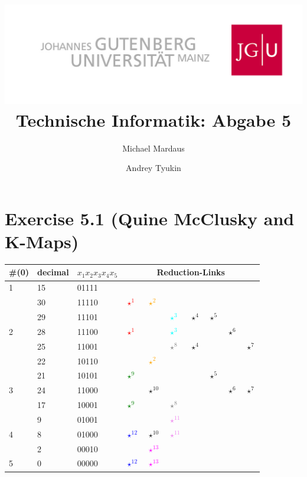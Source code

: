 \documentclass[10pt,a4paper]{scrartcl}
\author{Michael Mardaus \and Andrey Tyukin}
\title{\includegraphics[scale=0.2]{../logo_schriftzug}\\
Technische Informatik: Abgabe 5}
\newcommand{\subExercise}[1]{\vspace{0.5em} \noindent{\bf #1)}}
\begin{document}
\maketitle

\section*{Exercise 5.1 (Quine McClusky and K-Maps)}
\subExercise{a}
\begin{tabular}{|l||l|l|l|l|l|l|l|l|l|}\hline
\#(0) & decimal & $x_1x_2x_3x_4x_5$ & \multicolumn{7}{c|}{Reduction-Links}                \\\hline\hline
1     & 15      & 01111             & &&&&&&                                   \\
      & 30      & 11110             & \textcolor{red}{$\star^1$} & \textcolor{orange}{$\star^2$} &&&&&              \\
      & 29      & 11101             & &&\textcolor{cyan}{$\star^3$}&$\star^4$&$\star^5$&&        \\\hline
2     & 28      & 11100             & \textcolor{red}{$\star^1$}&&\textcolor{cyan}{$\star^3$}&&&$\star^6$&        \\
      & 25      & 11001             & &&\textcolor{gray}{$\star^8$}&$\star^4$&&&$\star^7$        \\
      & 22      & 10110             & &\textcolor{orange}{$\star^2$}&&&&&                          \\
      & 21      & 10101             & \textcolor{green}{$\star^9$}&&&&$\star^5$&&                 \\\hline
3     & 24      & 11000             & &$\star^{10}$&&&&$\star^6$&$\star^7$     \\
      & 17      & 10001             & \textcolor{green}{$\star^9$}&&\textcolor{gray}{$\star^8$}&&&&                 \\
      & 9       & 01001             & &&\textcolor{violet}{$\star^{11}$}&&&&                       \\\hline
4     & 8       & 01000             & \textcolor{blue}{$\star^{12}$}&$\star^{10}$&\textcolor{violet}{$\star^{11}$}&&&&\\
      & 2       & 00010             & &\textcolor{magenta}{$\star^{13}$}&&&&&                       \\\hline
5     & 0       & 00000             & \textcolor{blue}{$\star^{12}$}&\textcolor{magenta}{$\star^{13}$}&&&&&           \\\hline
\end{tabular}\\
\end{document}

